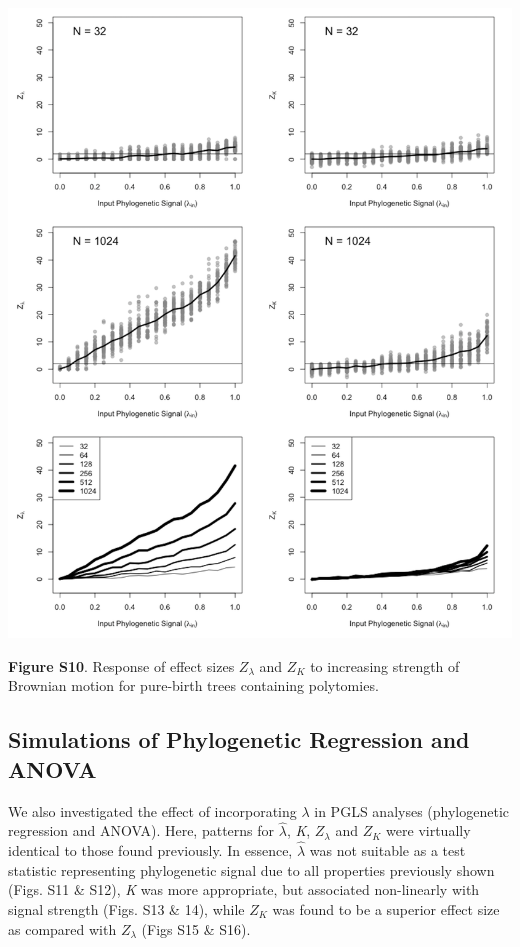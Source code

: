 \documentclass[
]{article}
\begin{document}
\includegraphics[width=0.95\linewidth]{fig.S10}

\textbf{Figure S10}. Response of effect sizes \(Z_{\lambda}\) and
\(Z_K\) to increasing strength of Brownian motion for pure-birth trees
containing polytomies.

\newpage

\hypertarget{simulations-of-phylogenetic-regression-and-anova}{%
\subsection{Simulations of Phylogenetic Regression and
ANOVA}\label{simulations-of-phylogenetic-regression-and-anova}}

We also investigated the effect of incorporating \(\lambda\) in PGLS
analyses (phylogenetic regression and ANOVA). Here, patterns for
\(\hat\lambda\), \emph{K}, \(Z_\lambda\) and \(Z_K\) were virtually
identical to those found previously. In essence, \(\hat\lambda\) was not
suitable as a test statistic representing phylogenetic signal due to all
properties previously shown (Figs. S11 \& S12), \emph{K} was more
appropriate, but associated non-linearly with signal strength (Figs. S13
\& 14), while \(Z_K\) was found to be a superior effect size as compared
with \(Z_\lambda\) (Figs S15 \& S16). \hfill\break
\end{document}
